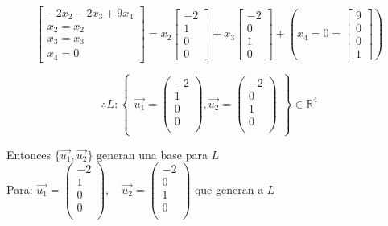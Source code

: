 \documentclass[12pt,a4paper]{report}
\begin{document}
\begin{enumerate}
\begin{enumerate}
\begin{equation*}
\begin{bmatrix}
-2x_{2}-2x_{3}+9x_{4}\\
x_{2}=x_{2}\\
x_{3}=x_{3}\\
x_{4}=0
\end{bmatrix}=
x_{2}\begin{bmatrix}
-2\\
1\\
0\\
0
\end{bmatrix}+
x_{3}\begin{bmatrix}
-2\\
0\\
1\\
0
\end{bmatrix}+
\left(  x_{4}=0=\begin{bmatrix}
9\\
0\\
0\\
1
\end{bmatrix}\right) 
\end{equation*}

\begin{equation*}
\therefore L:\begin{Bmatrix}
\vec{u_{1}}=\begin{pmatrix}
-2\\
1\\
0\\
0\\
\end{pmatrix},
\vec{u_{2}}=\begin{pmatrix}
-2\\
0\\
1\\
0\\
\end{pmatrix}
\end{Bmatrix}
\in \mathbb{R}^{4}
\end{equation*}


Entonces $\lbrace\vec{u_{1}},\vec{u_{2}}\rbrace$ generan una base para $L$\\

Para: $\vec{u_{1}}=\begin{pmatrix}
-2\\
1\\
0\\
0\\
\end{pmatrix},\quad
\vec{u_{2}}=\begin{pmatrix}
-2\\
0\\
1\\
0\\
\end{pmatrix}$ que generan a $L$\\


\end{enumerate}
\end{enumerate}
\end{document}
